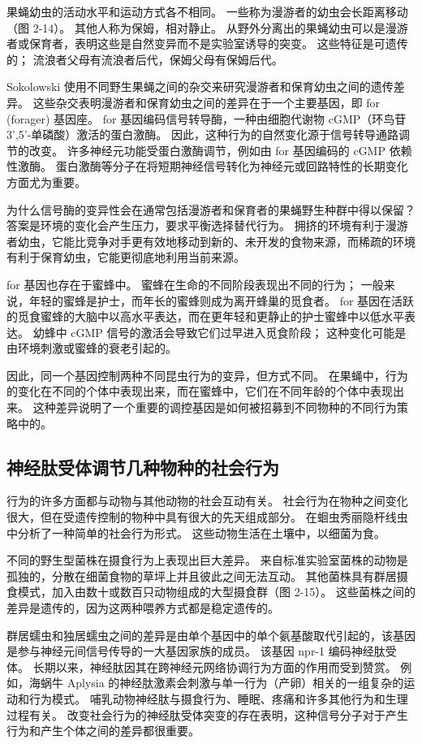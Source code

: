 果蝇幼虫的活动水平和运动方式各不相同。 
一些称为漫游者的幼虫会长距离移动（图 2-14）。 
其他人称为保姆，相对静止。 
从野外分离出的果蝇幼虫可以是漫游者或保育者，表明这些是自然变异而不是实验室诱导的突变。 
这些特征是可遗传的； 流浪者父母有流浪者后代，保姆父母有保姆后代。


Sokolowski 使用不同野生果蝇之间的杂交来研究漫游者和保育幼虫之间的遗传差异。 
这些杂交表明漫游者和保育幼虫之间的差异在于一个主要基因，即 for (forager) 基因座。 
for 基因编码信号转导酶，一种由细胞代谢物 cGMP（环鸟苷 3',5'-单磷酸）激活的蛋白激酶。 
因此，这种行为的自然变化源于信号转导通路调节的改变。 
许多神经元功能受蛋白激酶调节，例如由 for 基因编码的 cGMP 依赖性激酶。 
蛋白激酶等分子在将短期神经信号转化为神经元或回路特性的长期变化方面尤为重要。


为什么信号酶的变异性会在通常包括漫游者和保育者的果蝇野生种群中得以保留？ 
答案是环境的变化会产生压力，要求平衡选择替代行为。 
拥挤的环境有利于漫游者幼虫，它能比竞争对手更有效地移动到新的、未开发的食物来源，而稀疏的环境有利于保育幼虫，它能更彻底地利用当前来源。


for 基因也存在于蜜蜂中。 
蜜蜂在生命的不同阶段表现出不同的行为； 
一般来说，年轻的蜜蜂是护士，而年长的蜜蜂则成为离开蜂巢的觅食者。 
for 基因在活跃的觅食蜜蜂的大脑中以高水平表达，而在更年轻和更静止的护士蜜蜂中以低水平表达。 
幼蜂中 cGMP 信号的激活会导致它们过早进入觅食阶段； 
这种变化可能是由环境刺激或蜜蜂的衰老引起的。


因此，同一个基因控制两种不同昆虫行为的变异，但方式不同。 
在果蝇中，行为的变化在不同的个体中表现出来，而在蜜蜂中，它们在不同年龄的个体中表现出来。 
这种差异说明了一个重要的调控基因是如何被招募到不同物种的不同行为策略中的。


\subsection{神经肽受体调节几种物种的社会行为}
行为的许多方面都与动物与其他动物的社会互动有关。 
社会行为在物种之间变化很大，但在受遗传控制的物种中具有很大的先天组成部分。 
在蛔虫秀丽隐杆线虫中分析了一种简单的社会行为形式。 
这些动物生活在土壤中，以细菌为食。


不同的野生型菌株在摄食行为上表现出巨大差异。 
来自标准实验室菌株的动物是孤独的，分散在细菌食物的草坪上并且彼此之间无法互动。 
其他菌株具有群居摄食模式，加入由数十或数百只动物组成的大型摄食群（图 2-15）。 
这些菌株之间的差异是遗传的，因为这两种喂养方式都是稳定遗传的。


群居蠕虫和独居蠕虫之间的差异是由单个基因中的单个氨基酸取代引起的，该基因是参与神经元间信号传导的一大基因家族的成员。 
该基因 npr-1 编码神经肽受体。 
长期以来，神经肽因其在跨神经元网络协调行为方面的作用而受到赞赏。 
例如，海蜗牛 Aplysia 的神经肽激素会刺激与单一行为（产卵）相关的一组复杂的运动和行为模式。 
哺乳动物神经肽与摄食行为、睡眠、疼痛和许多其他行为和生理过程有关。 
改变社会行为的神经肽受体突变的存在表明，这种信号分子对于产生行为和产生个体之间的差异都很重要。


